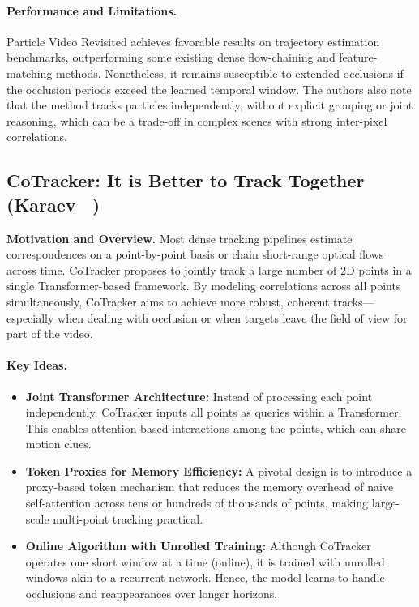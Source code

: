 \documentclass[11pt]{article}
\begin{document}
\paragraph{Performance and Limitations.}
Particle Video Revisited achieves favorable results on trajectory estimation benchmarks, outperforming some existing dense flow-chaining and feature-matching methods. Nonetheless, it remains susceptible to extended occlusions if the occlusion periods exceed the learned temporal window. The authors also note that the method tracks particles independently, without explicit grouping or joint reasoning, which can be a trade-off in complex scenes with strong inter-pixel correlations.

\subsection{CoTracker: It is Better to Track Together (Karaev \etal~\cite{karaev2024cotracker})}
\textbf{Motivation and Overview.}
Most dense tracking pipelines estimate correspondences on a point-by-point basis or chain short-range optical flows across time. CoTracker proposes to jointly track a large number of 2D points in a single Transformer-based framework. By modeling correlations across all points simultaneously, CoTracker aims to achieve more robust, coherent tracks—especially when dealing with occlusion or when targets leave the field of view for part of the video.

\paragraph{Key Ideas.}
\begin{itemize}
\item \textbf{Joint Transformer Architecture:} Instead of processing each point independently, CoTracker inputs all points as queries within a Transformer. This enables attention-based interactions among the points, which can share motion clues.
\item \textbf{Token Proxies for Memory Efficiency:} A pivotal design is to introduce a proxy-based token mechanism that reduces the memory overhead of naive self-attention across tens or hundreds of thousands of points, making large-scale multi-point tracking practical.
\item \textbf{Online Algorithm with Unrolled Training:} Although CoTracker operates one short window at a time (online), it is trained with unrolled windows akin to a recurrent network. Hence, the model learns to handle occlusions and reappearances over longer horizons.
\end{itemize}
\end{document}
